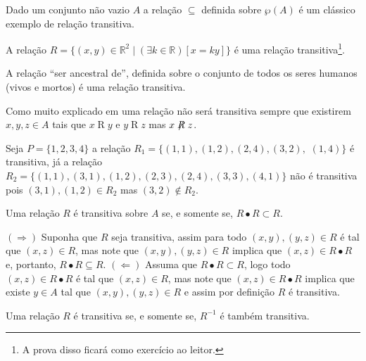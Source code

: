 \begin{exemplo}
	Dado um conjunto não vazio $A$ a relação $\subseteq$ definida sobre $\wp(A)$ é um clássico exemplo de relação transitiva.
\end{exemplo}

\begin{exemplo}
	A relação $R = \{(x, y) \in \mathbb{R}^2 \mid (\exists k \in \mathbb{R})[x = ky]\}$ é uma relação transitiva\footnote{A prova disso ficará como exercício ao leitor.}.
\end{exemplo}

\begin{exemplo}
	A relação ``ser ancestral de'', definida sobre o conjunto de todos os seres humanos (vivos e mortos) é uma relação transitiva.
\end{exemplo}

Como muito explicado em \cite{abe1991-TC} uma relação não será transitiva sempre que existirem $x, y, z \in A$ tais que  $x \mathrel{R} y$ e $y \mathrel{R} z$ mas $x \centernot{R} z$.

\begin{exemplo}
	Seja $P = \{1, 2, 3, 4\}$ a relação $R_1 = \{(1, 1), (1, 2), (2, 4), (3, 2),$ $(1, 4)\}$ é transitiva, já a relação $R_2 = \{(1, 1), (3, 1), (1, 2), (2,3), (2, 4), (3, 3), (4, 1)\}$ não é transitiva pois $(3, 1), (1, 2) \in R_2$ mas $(3, 2) \notin R_2$.
\end{exemplo}

\begin{teorema}\label{teo:CaracterizacaoRelacaoTransitivas}
	Uma relação $R$ é transitiva sobre $A$ se, e somente se, $R \bullet R \subset R$.
\end{teorema}

\begin{prova}
	$(\Rightarrow)$ Suponha que $R$ seja transitiva, assim para todo $(x, y), (y, z) \in R$ é tal que $(x, z) \in R$, mas note que $(x, y), (y, z) \in R$ implica que $(x, z) \in R \bullet R$ e, portanto, $R \bullet R \subseteq R$. $(\Leftarrow)$ Assuma que $R \bullet R \subset R$, logo todo $(x, z) \in R \bullet R$ é tal que $(x, z) \in R$, mas note que $(x, z) \in R \bullet R$ implica que existe $y \in A$ tal que $(x, y), (y, z) \in R$ e assim por definição $R$ é transitiva. 
\end{prova}

\begin{corolario}
	Uma relação $R$ é transitiva se, e somente se, $R^{-1}$ é também transitiva.
\end{corolario}

